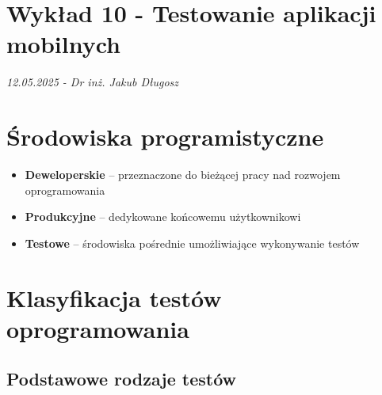 \section*{Wykład 10 - Testowanie aplikacji mobilnych}
\textit{12.05.2025 - Dr inż. Jakub Długosz}

\section{Środowiska programistyczne}

\begin{tcolorbox}[colback=blue!5!white,colframe=blue!75!black,title=Podział środowisk]
\begin{itemize}[leftmargin=*]
    \item \textbf{Deweloperskie} -- przeznaczone do bieżącej pracy nad rozwojem oprogramowania
    \item \textbf{Produkcyjne} -- dedykowane końcowemu użytkownikowi
    \item \textbf{Testowe} -- środowiska pośrednie umożliwiające wykonywanie testów
\end{itemize}
\end{tcolorbox}

\section{Klasyfikacja testów oprogramowania}

\subsection{Podstawowe rodzaje testów}

